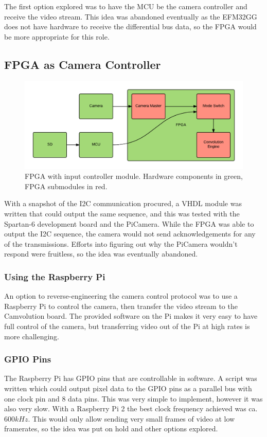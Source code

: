 The first option explored was to have the MCU be the camera controller and receive the video stream.
This idea was abandoned eventually as the EFM32GG does not have hardware to receive the differential bus data,
so the FPGA would be more appropriate for this role.

\subsection{FPGA as Camera Controller}
\begin{figure}
    \centering
    \includegraphics[width=\linewidth]{img/FPGA_CameraMaster}
    \caption{FPGA with input controller module. Hardware components in green, FPGA submodules in red.}
    \label{fig:FPGA_CameraMaster}
\end{figure}

With a snapshot of the I2C communication procured,
a VHDL module was written that could output the same sequence,
and this was tested with the Spartan-6 development board and the PiCamera.
While the FPGA was able to output the I2C sequence,
the camera would not send acknowledgements for any of the transmissions.
Efforts into figuring out why the PiCamera wouldn't respond were fruitless, so the idea was eventually abandoned.

\subsubsection{Using the Raspberry Pi}
An option to reverse-engineering the camera control protocol was to use a Raspberry Pi to control the camera,
then transfer the video stream to the Camvolution board.
The provided software on the Pi makes it very easy to have full control of the camera,
but transferring video out of the Pi at high rates is more challenging.

\subsubsection{GPIO Pins}
The Raspberry Pi has GPIO pins that are controllable in software.
A script was written which could output pixel data to the GPIO pins as a parallel bus with one clock pin and 8 data pins.
This was very simple to implement, however it was also very slow.
With a Raspberry Pi 2 the best clock frequency achieved was ca. $600kHz$.
This would only allow sending very small frames of video at low framerates,
so the idea was put on hold and other options explored.

